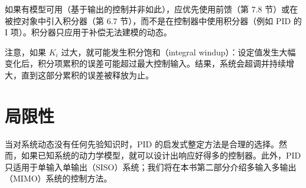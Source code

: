 \begin{tip}
如果有模型可用（基于输出的控制并非如此），应优先使用前馈（第 7.8 节）或在被控对象中引入积分器（第 6.7 节），而不是在控制器中使用积分器（例如 PID 的 I 项）。积分器只应用于补偿无法建模的动态。
\end{tip}

注意，如果 $K_i$ 过大，就可能发生积分饱和（integral windup）：设定值发生大幅变化后，积分项累积的误差可能超过最大控制输入。结果，系统会超调并持续增大，直到这部分累积的误差被释放为止。

\section{局限性}
\label{sec:limitations}

当对系统动态没有任何先验知识时，PID 的启发式整定方法是合理的选择。然而，如果已知系统的动力学模型，就可以设计出响应好得多的控制器。此外，PID 只适用于单输入单输出（SISO）系统；我们将在本书第二部分介绍多输入多输出（MIMO）系统的控制方法。
